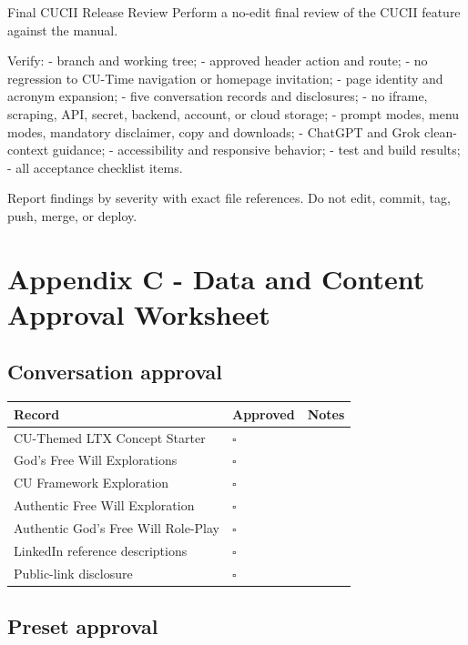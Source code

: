 \documentclass[11pt,letterpaper]{article}
\newcommand{\checkbox}{\(\square\)}
\begin{document}
\begin{promptbox}{Final CUCII Release Review}
Perform a no-edit final review of the CUCII feature against the manual.

Verify:
- branch and working tree;
- approved header action and route;
- no regression to CU-Time navigation or homepage invitation;
- page identity and acronym expansion;
- five conversation records and disclosures;
- no iframe, scraping, API, secret, backend, account, or cloud storage;
- prompt modes, menu modes, mandatory disclaimer, copy and downloads;
- ChatGPT and Grok clean-context guidance;
- accessibility and responsive behavior;
- test and build results;
- all acceptance checklist items.

Report findings by severity with exact file references.
Do not edit, commit, tag, push, merge, or deploy.
\end{promptbox}

\section{Appendix C - Data and Content Approval Worksheet}

\subsection*{Conversation approval}

\begin{longtable}{L{2.1in}L{0.75in}L{3.5in}}
\toprule
\textbf{Record} & \textbf{Approved} & \textbf{Notes} \\
\midrule
\endhead
CU-Themed LTX Concept Starter & \checkbox &  \\
God's Free Will Explorations & \checkbox &  \\
CU Framework Exploration & \checkbox &  \\
Authentic Free Will Exploration & \checkbox &  \\
Authentic God's Free Will Role-Play & \checkbox &  \\
LinkedIn reference descriptions & \checkbox &  \\
Public-link disclosure & \checkbox &  \\
\bottomrule
\end{longtable}

\subsection*{Preset approval}
\end{document}

